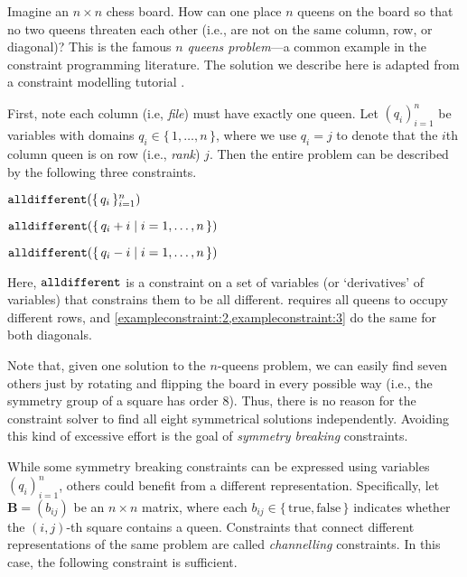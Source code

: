 \begin{example}[$n$ queens]
  Imagine an $n \times n$ chess board. How can one place $n$ queens on the board so that no two queens threaten each other (i.e., are not on the same column, row, or diagonal)? This is the famous \emph{$n$ queens problem}---a common example in the constraint programming literature. The solution we describe here is adapted from a constraint modelling tutorial \citep{minizinc}.

  First, note each column (i.e, \emph{file}) must have exactly one queen. Let $(q_i)_{i=1}^n$ be variables with domains $q_i \in \{\, 1, \dots, n \,\}$, where we use $q_i = j$ to denote that the $i$th column queen is on row (i.e., \emph{rank}) $j$. Then the entire problem can be described by the following three constraints.

  \begin{constraint} \label{exampleconstraint:1}
    $\operatorname{\mathtt{alldifferent}}(\{\,q_i\,\}_{i=1}^n)$
  \end{constraint}

  \begin{constraint} \label{exampleconstraint:2}
    $\operatorname{\mathtt{alldifferent}}(\{\, q_i + i \mid i = 1, \dots, n \,\})$
  \end{constraint}

  \begin{constraint} \label{exampleconstraint:3}
    $\operatorname{\mathtt{alldifferent}}(\{\, q_i - i \mid i = 1, \dots, n \,\})$
  \end{constraint}

  Here, $\operatorname{\mathtt{alldifferent}}$ is a constraint on a set of variables (or `derivatives' of variables) that constrains them to be all different.  requires all queens to occupy different rows, and \cref{exampleconstraint:2,exampleconstraint:3} do the same for both diagonals.

  Note that, given one solution to the $n$-queens problem, we can easily find seven others just by rotating and flipping the board in every possible way (i.e., the symmetry group of a square has order 8). Thus, there is no reason for the constraint solver to find all eight symmetrical solutions independently. Avoiding this kind of excessive effort is the goal of \emph{symmetry breaking} constraints.

  While some symmetry breaking constraints can be expressed using variables $(q_i)_{i=1}^n$, others could benefit from a different representation. Specifically, let $\mathbf{B} = (b_{ij})$ be an $n \times n$ matrix, where each $b_{ij} \in \{\, \textrm{true}, \textrm{false} \,\}$ indicates whether the $(i,j)$-th square contains a queen. Constraints that connect different representations of the same problem are called \emph{channelling} constraints. In this case, the following constraint is sufficient.


\end{example}
